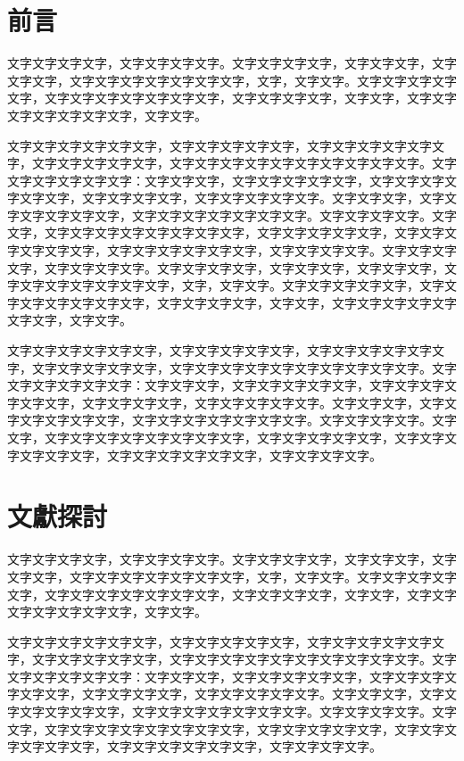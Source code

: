 \documentclass[12pt]{article}
\begin{document}
\section{前言}
文字文字文字文字，文字文字文字文字。文字文字文字文字，文字文字文字，文字文字文字，文字文字文字文字文字文字文字，文字，文字文字。文字文字文字文字文字，文字文字文字文字文字文字文字，文字文字文字文字，文字文字，文字文字文字文字文字文字文字，文字文字。

文字文字文字文字文字文字，文字文字文字文字文字，文字文字文字文字文字文字，文字文字文字文字文字，文字文字文字文字文字文字文字文字文字文字。文字文字文字文字文字文字：文字文字文字，文字文字文字文字文字，文字文字文字文字文字文字，文字文字文字文字，文字文字文字文字文字。文字文字文字，文字文字文字文字文字文字，文字文字文字文字文字文字文字。文字文字文字文字。文字文字，文字文字文字文字文字文字文字文字，文字文字文字文字文字，文字文字文字文字文字文字，文字文字文字文字文字文字，文字文字文字文字。文字文字文字文字，文字文字文字文字。文字文字文字文字，文字文字文字，文字文字文字，文字文字文字文字文字文字文字，文字，文字文字。文字文字文字文字文字，文字文字文字文字文字文字文字，文字文字文字文字，文字文字，文字文字文字文字文字文字文字，文字文字。

文字文字文字文字文字文字，文字文字文字文字文字，文字文字文字文字文字文字，文字文字文字文字文字，文字文字文字文字文字文字文字文字文字文字。文字文字文字文字文字文字：文字文字文字，文字文字文字文字文字，文字文字文字文字文字文字，文字文字文字文字，文字文字文字文字文字。文字文字文字，文字文字文字文字文字文字，文字文字文字文字文字文字文字。文字文字文字文字。文字文字，文字文字文字文字文字文字文字文字，文字文字文字文字文字，文字文字文字文字文字文字，文字文字文字文字文字文字，文字文字文字文字。



\section{文獻探討}
文字文字文字文字，文字文字文字文字。文字文字文字文字，文字文字文字，文字文字文字，文字文字文字文字文字文字文字，文字，文字文字。文字文字文字文字文字，文字文字文字文字文字文字文字，文字文字文字文字，文字文字，文字文字文字文字文字文字文字，文字文字。

文字文字文字文字文字文字，文字文字文字文字文字，文字文字文字文字文字文字，文字文字文字文字文字，文字文字文字文字文字文字文字文字文字文字。文字文字文字文字文字文字：文字文字文字，文字文字文字文字文字，文字文字文字文字文字文字，文字文字文字文字，文字文字文字文字文字。文字文字文字，文字文字文字文字文字文字，文字文字文字文字文字文字文字。文字文字文字文字。文字文字，文字文字文字文字文字文字文字文字，文字文字文字文字文字，文字文字文字文字文字文字，文字文字文字文字文字文字，文字文字文字文字。
\end{document}
